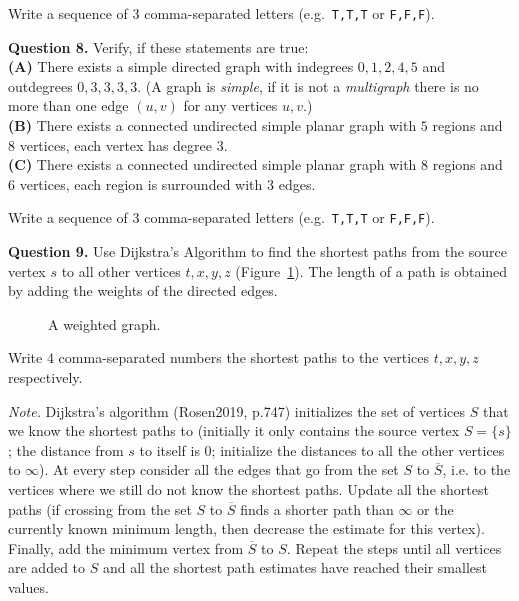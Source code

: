 \documentclass[jou]{apa6}
\begin{document}
Write a sequence of 3 comma-separated letters (e.g.\ {\tt T,T,T} or {\tt F,F,F}).




\vspace{10pt}
{\bf Question 8.} Verify, if these statements are true:\\
{\bf (A)} There exists a simple directed graph with indegrees $0,1,2,4,5$ and outdegrees $0,3,3,3,3$. (A graph is {\em simple}, if
it is not a {\em multigraph} \textendash{} there is no more than one edge $(u,v)$ for any vertices $u,v$.)\\
{\bf (B)} There exists a connected undirected simple planar graph with $5$ regions and $8$ vertices, each vertex has degree $3$.\\
{\bf (C)} There exists a connected undirected simple planar graph with $8$ regions and $6$ vertices, each region is surrounded 
with $3$ edges.

Write a sequence of 3 comma-separated letters (e.g.\ {\tt T,T,T} or {\tt F,F,F}).



\vspace{10pt}
{\bf Question 9.}
Use Dijkstra’s Algorithm to find the shortest paths from the source vertex $s$ 
to all other vertices $t,x,y,z$ (Figure~\ref{fig:dijkstra}). The length of a path is obtained by adding the 
weights of the directed edges.

\begin{figure}[!htb]
\caption{\label{fig:dijkstra} A weighted graph.}
\end{figure}


Write $4$ comma-separated numbers \textendash{} the shortest paths 
to the vertices $t,x,y,z$ respectively.

{\em Note.} Dijkstra's algorithm (Rosen2019, p.747) initializes the set of vertices $S$ that we 
know the shortest paths to (initially it only contains the 
source vertex $S = \{ s \}$; 
the distance from $s$ to itself is $0$; initialize the distances to 
all the other vertices to $\infty$). At every step consider all the edges that 
go from the set $S$ to $\overline{S}$, i.e. to the vertices where we still 
do not know the shortest paths. Update all the shortest paths (if crossing from 
the set $S$ to $\overline{S}$ finds a shorter path than $\infty$ or the currently 
known minimum length, then decrease the estimate for this vertex). 
Finally, add the minimum vertex from $\overline{S}$ to $S$. Repeat the steps
until all vertices are added to $S$ and all the shortest path estimates have 
reached their smallest values.
\end{document}
